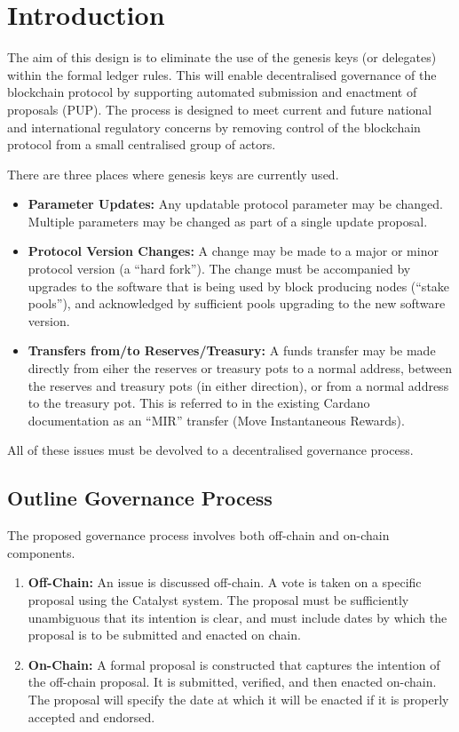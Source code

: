 \section{Introduction}

The aim of this design is to eliminate the use of the genesis keys (or delegates) within the formal ledger rules.  This will enable
decentralised governance of the blockchain protocol by supporting automated submission and enactment of proposals (PUP).
The process is designed to meet current and future national and international regulatory concerns by removing control of the blockchain protocol
from a small centralised group of actors.

There are three places where genesis keys are currently used.


\begin{itemize}
\item
  \textbf{Parameter Updates:}
  Any updatable protocol parameter may be changed.  Multiple parameters may be changed as part of a single update proposal.
\item
  \textbf{Protocol Version Changes:}
  A change may be made to a major or minor protocol version (a ``hard fork'').  The change must be accompanied by upgrades to
  the software that is being used by block producing nodes (``stake pools''), and acknowledged by sufficient pools upgrading to the new software version.
\item
  \textbf{Transfers from/to Reserves/Treasury:}
  A funds transfer may be made directly from eiher the reserves or treasury pots to a normal address, between the reserves and treasury pots (in either direction), or from a normal address to the treasury pot.  This is referred to in the existing Cardano documentation as an ``MIR'' transfer (Move Instantaneous Rewards).
\end{itemize}

All of these issues must be devolved to a decentralised governance process.

\subsection{Outline Governance Process}

The proposed governance process involves both off-chain and on-chain components.

\begin{enumerate}
\item
  \textbf{Off-Chain:}
  An issue is discussed off-chain.  A vote is taken on a specific proposal using the Catalyst system.  The proposal must be sufficiently unambiguous that its intention is clear, and must include dates by which the proposal is to be submitted and enacted on chain.
\item
  \textbf{On-Chain:}
  A formal proposal is constructed that captures the intention of the off-chain proposal.  It is submitted, verified, and then enacted on-chain.  The proposal will specify the date at which it will be enacted if it is
  properly accepted and endorsed.
\end{enumerate}


